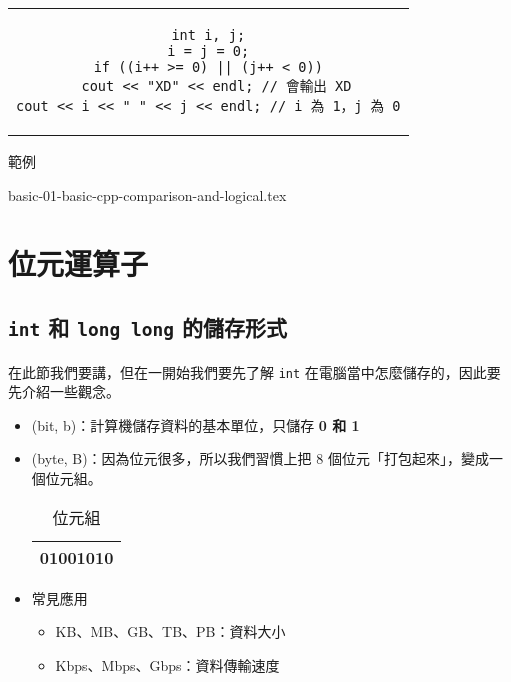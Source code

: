 \documentclass[12pt,a4paper,oneside]{report}
\begin{document}
\begin{CJK}{UTF8}{bkai}
\begin{itemize}
\begin{code}[h!]
\centering
\begin{tabular}{c}
\begin{lstlisting}
int i, j;
i = j = 0;
if ((i++ >= 0) || (j++ < 0))
  cout << "XD" << endl; // 會輸出 XD
cout << i << " " << j << endl; // i 為 1，j 為 0
\end{lstlisting}
\end{tabular}
\caption{範例}
\label{basic:cpp:code:short:cut:2}
\end{code}

\end{itemize}

\label{basic:cpp:problem:comparison}
{basic-01-basic-cpp-comparison-and-logical.tex}

\section{位元運算子}
\subsection{\lstinline!int! 和 \lstinline!long long! 的儲存形式}

\paragraph{}在此節我們要講，但在一開始我們要先了解 \lstinline!int! 在電腦當中怎麼儲存的，因此要先介紹一些觀念。

\begin{itemize}
\item {} (bit, b)：計算機儲存資料的基本單位，只儲存 \textbf{0 和 1}
\item {} (byte, B)：因為位元很多，所以我們習慣上把 8 個位元「打包起來」，變成一個位元組。

\begin{table}[h]
\centering
\begin{tabular}{|c|}
\hline
01001010\\
\hline
\end{tabular}
\caption{位元組}
\label{basic:cpp:table:byte}
\end{table}

\item 常見應用
  \begin{itemize}
  \item KB、MB、GB、TB、PB：資料大小
  \item Kbps、Mbps、Gbps：資料傳輸速度
  \end{itemize}
\end{itemize}


\end{CJK}
\end{document}
